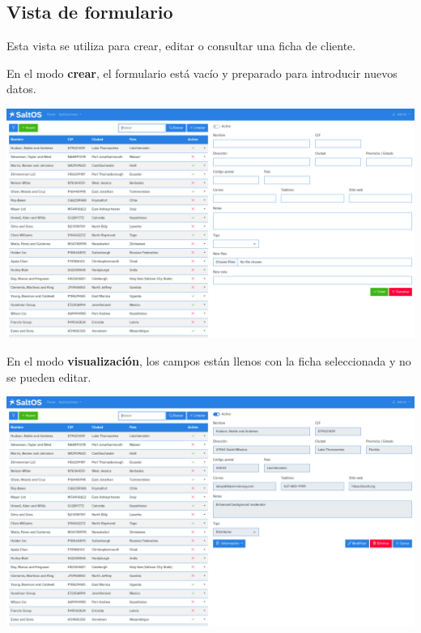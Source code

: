 \documentclass[a4paper]{article}
\begin{document}
\hypertarget{toc49}{}
\subsection{Vista de formulario}

Esta vista se utiliza para crear, editar o consultar una ficha de cliente.

En el modo \textbf{crear}, el formulario está vacío y preparado para introducir nuevos datos.

\begin{center}\includegraphics[width=1\textwidth]{../ujest/snaps/test-screenshots-js-screenshots-crm-customers-create-es-es-1-snap.png}\end{center}

En el modo \textbf{visualización}, los campos están llenos con la ficha seleccionada y no se pueden editar.

\begin{center}\includegraphics[width=1\textwidth]{../ujest/snaps/test-screenshots-js-screenshots-crm-customers-view-100-es-es-1-snap.png}\end{center}
\end{document}
